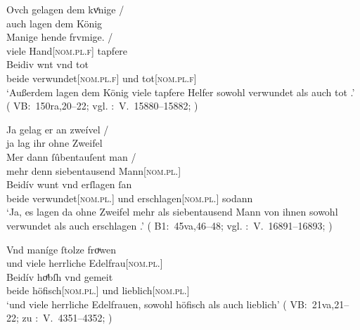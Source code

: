 \begin{exe}
\begin{xlist}
	\ex \label{ex:konjadjvvbeidiu_4} %
		\gll Ovch gelagen dem kvͤnige {/} \\
			auch lagen dem König \\
		\gll Manige hende frvmige. {/} \\
			viele Hand[\textsc{nom.pl.f\subM}] tapfere \\
		\gll Beidiv wnt vnd tot \\
			beide verwundet[\textsc{nom.pl.f\subM}] und
			tot[\textsc{nom.pl.f\subM}] \\
		\trans `Außerdem lagen dem König viele tapfere Helfer
			sowohl verwundet als auch tot .'
			(%
				VB:~150ra,20--22; vgl.
				\KC:~V.~15880--15882;
				\cite[363]{schroeder1895}%
			)

	\ex \label{ex:konjadjvvbeidiu_5} %
		\gll Ja gelag er an zweível {/} \\
			ja lag ihr ohne Zweifel \\
		\gll Mer dann ſûbentauſent man {/} \\
			mehr denn siebentausend Mann[\textsc{nom.pl.\MascM}] \\
		\gll Beidív wunt vnd erſlagen ſan \\
			beide verwundet[\textsc{nom.pl.\MascM}] und
			erschlagen[\textsc{nom.pl.\MascM}] sodann \\
		\trans `Ja, es lagen da ohne Zweifel mehr als siebentausend Mann
		von ihnen sowohl verwundet als auch erschlagen .'
			(%
				B1:~45va,46--48; vgl.
				\KC:~V.~16891--16893;
				\cite[368]{schroeder1895}%
			)

	\ex \label{ex:konjadjvvbeidiu_6} %
		\gll Vnd maníge ſtolze froͮwen \\
			und viele herrliche Edelfrau[\textsc{nom.pl.\FemF}] \\
	\sn \gll Beidív hoͤbſh vnd gemeit \\
			beide höfisch[\textsc{nom.pl.\FemF}] und lieblich[\textsc{nom.pl.\FemF}] \\
		\trans `und viele herrliche Edelfrauen,  sowohl
			höfisch als auch lieblich'
			(%
				VB:~21va,21--22; zu
				\KC:~V.~4351--4352;
				\cite[161]{schroeder1895}%
			)
	\end{xlist}
\end{exe}

